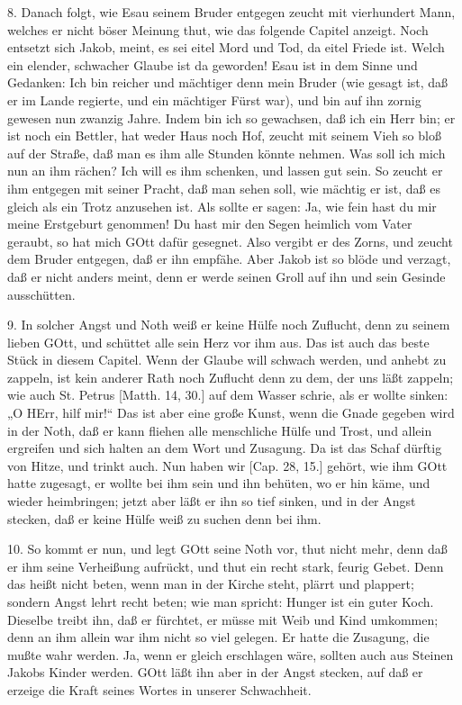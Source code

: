 8. Danach folgt, wie Esau seinem Bruder entgegen zeucht mit vierhundert Mann, welches er nicht böser Meinung thut, wie das folgende Capitel anzeigt. Noch entsetzt sich Jakob, meint, es sei eitel Mord und Tod, da eitel Friede ist. Welch ein elender, schwacher Glaube ist da geworden! Esau ist in dem Sinne und Gedanken: Ich bin reicher und mächtiger denn mein Bruder (wie gesagt ist, daß er im Lande regierte, und ein mächtiger Fürst war), und bin auf ihn zornig gewesen nun zwanzig Jahre. Indem bin ich so gewachsen, daß ich ein Herr bin; er ist noch ein Bettler, hat weder Haus noch Hof, zeucht mit seinem Vieh so bloß auf der Straße, daß man es ihm alle Stunden könnte nehmen. Was soll ich mich nun an ihm rächen? Ich will es ihm schenken, und lassen gut sein. So zeucht er ihm entgegen mit seiner Pracht, daß man sehen soll, wie mächtig er ist, daß es gleich als ein Trotz anzusehen ist. Als sollte er sagen: Ja, wie fein hast du mir meine Erstgeburt genommen! Du hast mir den Segen heimlich vom Vater geraubt, so hat mich GOtt dafür gesegnet. Also vergibt er des Zorns, und zeucht dem Bruder entgegen, daß er ihn empfähe. Aber Jakob ist so blöde und verzagt, daß er nicht anders meint, denn er werde seinen Groll auf ihn und sein Gesinde ausschütten.

9. In solcher Angst und Noth weiß er keine Hülfe noch Zuflucht, denn zu seinem lieben GOtt, und schüttet alle sein Herz vor ihm aus. Das ist auch das beste Stück in diesem Capitel. Wenn der Glaube will schwach werden, und anhebt zu zappeln, ist kein anderer Rath noch Zuflucht denn zu dem, der uns läßt zappeln; wie auch St. Petrus [Matth. 14, 30.] auf dem Wasser schrie, als er wollte sinken: „O HErr, hilf mir!“ Das ist aber eine große Kunst, wenn die Gnade gegeben wird in der Noth, daß er kann fliehen alle menschliche Hülfe und Trost, und allein ergreifen und sich halten an dem Wort und Zusagung. Da ist das Schaf dürftig von Hitze, und trinkt auch. Nun haben wir [Cap. 28, 15.] gehört, wie ihm GOtt hatte zugesagt, er wollte bei ihm sein und ihn behüten, wo er hin käme, und wieder heimbringen; jetzt aber läßt er ihn so tief sinken, und in der Angst stecken, daß er keine Hülfe weiß zu suchen denn bei ihm.

10. So kommt er nun, und legt GOtt seine Noth vor, thut nicht mehr, denn daß er ihm seine Verheißung aufrückt, und thut ein recht stark, feurig Gebet. Denn das heißt nicht beten, wenn man in der Kirche steht, plärrt und plappert; sondern Angst lehrt recht beten; wie man spricht: Hunger ist ein guter Koch. Dieselbe treibt ihn, daß er fürchtet, er müsse mit Weib und Kind umkommen; denn an ihm allein war ihm nicht so viel gelegen. Er hatte die Zusagung, die mußte wahr werden. Ja, wenn er gleich erschlagen wäre, sollten auch aus Steinen Jakobs Kinder werden. GOtt läßt ihn aber in der Angst stecken, auf daß er erzeige die Kraft seines Wortes in unserer Schwachheit.

